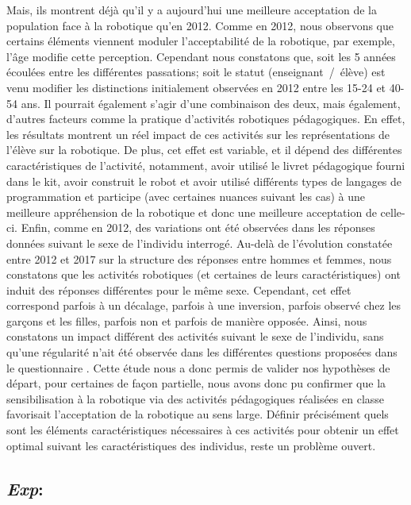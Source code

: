             Mais, ils montrent déjà qu'il y a aujourd'hui une meilleure acceptation de la population face à la robotique qu'en 2012. Comme en 2012, nous observons que certains éléments viennent moduler l'acceptabilité de la robotique, par exemple, l'âge modifie cette perception. Cependant nous constatons que, soit les 5 années écoulées entre les différentes passations; soit le statut (enseignant~/~élève) est venu modifier les distinctions initialement observées en 2012 entre les 15-24 et 40-54 ans. Il pourrait également s'agir d'une combinaison des deux, mais également, d'autres facteurs comme la pratique d'activités robotiques pédagogiques. En effet, les résultats montrent un réel impact de ces activités sur les représentations de l'élève sur la robotique. De plus, cet effet est variable, et il dépend des différentes caractéristiques de l'activité, notamment, avoir utilisé le livret pédagogique fourni dans le kit, avoir construit le robot et avoir utilisé différents types de langages de programmation et participe (avec certaines nuances suivant les cas) à une meilleure appréhension de la robotique et donc une meilleure acceptation de celle-ci. Enfin, comme en 2012, des variations ont été observées dans les réponses données suivant le sexe de l'individu interrogé. Au-delà de l'évolution constatée entre 2012 et 2017 sur la structure des réponses entre hommes et femmes, nous constatons que les activités robotiques (et certaines de leurs caractéristiques) ont induit des réponses différentes pour le même sexe. Cependant, cet effet correspond parfois à un décalage, parfois à une inversion, parfois  observé chez les garçons et les filles, parfois non et parfois de manière opposée. Ainsi, nous constatons un impact différent des activités suivant le sexe de l'individu, sans qu'une régularité n'ait été observée dans les différentes questions proposées dans le questionnaire . Cette étude nous a donc permis de valider nos hypothèses de départ, pour certaines de façon partielle, nous avons donc pu confirmer que la sensibilisation à la robotique via des activités pédagogiques réalisées en classe favorisait l'acceptation de la robotique au sens large. Définir précisément quels sont les éléments caractéristiques nécessaires à ces activités pour obtenir un effet optimal suivant les caractéristiques des individus, reste un problème ouvert.
    \subsection{\textit{Exp}: }\label{Exp:name_for_bot}
